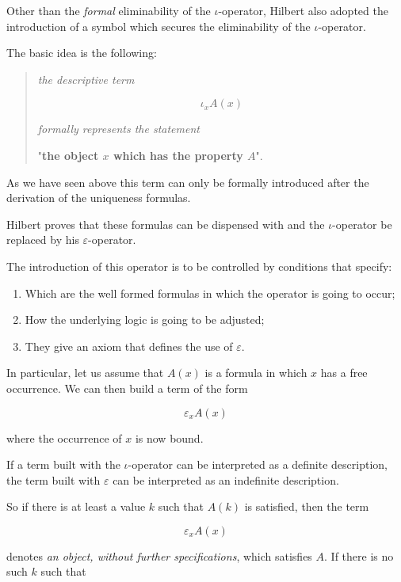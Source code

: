 \documentclass[12pt]{article}
\begin{document}
Other than the \emph{formal} eliminability of the $\iota$-operator, Hilbert also adopted the introduction of a symbol which secures the eliminability of the $\iota$-operator. 

The basic idea is the following:

\begin{quotation}
\emph{the descriptive term}

$$\iota_{x} A (x)$$ 

\emph{formally represents the statement}

\begin{center}
"\textbf{the object $x$ which has the property $A$}".
\end{center}
\end{quotation}

As we have seen above this term can only be formally introduced after the derivation of the uniqueness formulas.

Hilbert proves that these formulas can be dispensed with and the $\iota$-operator be replaced by his $\varepsilon$-operator.

The introduction of this operator is to be controlled by conditions that specify:

\begin{enumerate}
\item Which are the well formed formulas in which the operator is going to occur; 

\item How the underlying logic is going to be adjusted;

\item They give  an axiom that defines the use of $\varepsilon$.
\end{enumerate}

In particular, let us assume that $A (x)$ is a formula in which $x$ has a free occurrence. We can then build a term of the form 

$$\varepsilon_{x} A (x)$$

where the occurrence of $x$ is now bound.

If a term built with the $\iota$-operator can be interpreted as a definite description, the term built with $\varepsilon$ can be interpreted as an indefinite description.

So if there is at least a value $k$ such that $A (k)$ is satisfied, then the term

$$\varepsilon_{x} A (x)$$
 
denotes \emph{an object, without further specifications}, which satisfies $A$. If there is no such $k$ such that 
\end{document}
